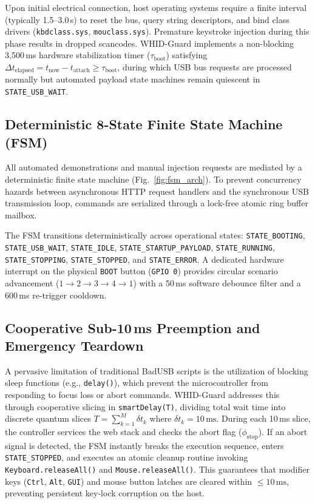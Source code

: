 \documentclass[conference]{IEEEtran}
\begin{document}
Upon initial electrical connection, host operating systems require a finite interval (typically 1.5--3.0\,s) to reset the bus, query string descriptors, and bind class drivers (\texttt{kbdclass.sys}, \texttt{mouclass.sys}). Premature keystroke injection during this phase results in dropped scancodes. WHID-Guard implements a non-blocking 3,500\,ms hardware stabilization timer ($\tau_{\text{boot}}$) satisfying $\Delta t_{\text{elapsed}} = t_{\text{now}} - t_{\text{attach}} \ge \tau_{\text{boot}}$, during which USB bus requests are processed normally but automated payload state machines remain quiescent in \texttt{STATE\_USB\_WAIT}.

\subsection{Deterministic 8-State Finite State Machine (FSM)}
All automated demonstrations and manual injection requests are mediated by a deterministic finite state machine (Fig.~\ref{fig:fsm_arch}). To prevent concurrency hazards between asynchronous HTTP request handlers and the synchronous USB transmission loop, commands are serialized through a lock-free atomic ring buffer mailbox.

The FSM transitions deterministically across operational states: \texttt{STATE\_BOOTING}, \texttt{STATE\_USB\_WAIT}, \texttt{STATE\_IDLE}, \texttt{STATE\_STARTUP\_PAYLOAD}, \texttt{STATE\_RUNNING}, \texttt{STATE\_STOPPING}, \texttt{STATE\_STOPPED}, and \texttt{STATE\_ERROR}. A dedicated hardware interrupt on the physical \texttt{BOOT} button (\texttt{GPIO 0}) provides circular scenario advancement ($1 \rightarrow 2 \rightarrow 3 \rightarrow 4 \rightarrow 1$) with a 50\,ms software debounce filter and a 600\,ms re-trigger cooldown.

\subsection{Cooperative Sub-10\,ms Preemption and Emergency Teardown}
A pervasive limitation of traditional BadUSB scripts is the utilization of blocking sleep functions (e.g., \texttt{delay()}), which prevent the microcontroller from responding to focus loss or abort commands. WHID-Guard addresses this through cooperative slicing in \texttt{smartDelay(T)}, dividing total wait time into discrete quantum slices $T = \sum_{k=1}^{M} \delta t_k$ where $\delta t_k = 10\,\text{ms}$. During each 10\,ms slice, the controller services the web stack and checks the abort flag ($\phi_{\text{stop}}$). If an abort signal is detected, the FSM instantly breaks the execution sequence, enters \texttt{STATE\_STOPPED}, and executes an atomic cleanup routine invoking \texttt{Keyboard.releaseAll()} and \texttt{Mouse.releaseAll()}. This guarantees that modifier keys (\texttt{Ctrl}, \texttt{Alt}, \texttt{GUI}) and mouse button latches are cleared within $\le 10\,\text{ms}$, preventing persistent key-lock corruption on the host.
\end{document}
